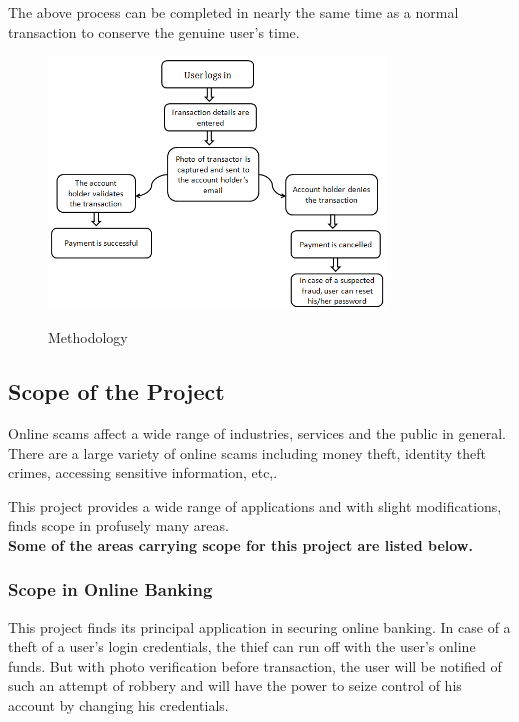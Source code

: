 \documentclass[12pt, oneside, a4paper]{article}
\begin{document}
The above process can be completed in nearly the same time as a normal transaction to conserve the genuine user's time.
\vspace{1.5cm}

\begin{figure}[H]
\begin{center}
\includegraphics[width=0.8\textwidth]{Figure2.png}\\
\caption{Methodology}
\label{fig:Figure 1}
\end{center}
\end{figure}



\pagebreak

\subsection{Scope of the Project}
Online scams affect a wide range of industries, services and the public in general. There are a large variety of online scams including money theft, identity theft crimes, accessing sensitive information, etc,. 

This project provides a wide range of applications and with slight modifications, finds scope in profusely many areas.\\
\textbf{Some of the areas carrying scope for this project are listed below.}

\subsubsection{Scope in Online Banking}
This project finds its principal application in securing online banking. In case of a theft of a user's login credentials, the thief can run off with the user's online funds. But with photo verification before transaction, the user will be notified of such an attempt of robbery and will have the power to seize control of his account by changing his credentials.
\end{document}
